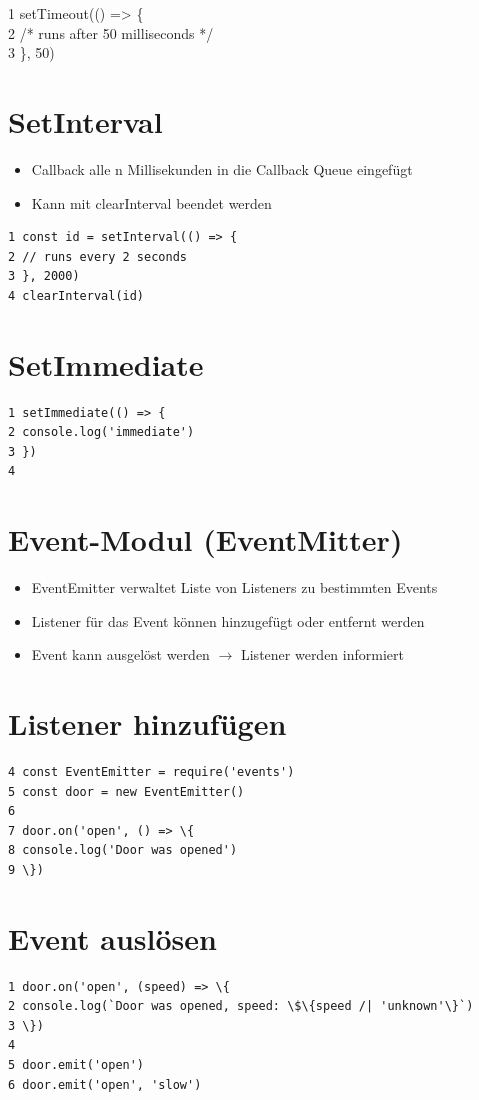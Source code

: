 1 setTimeout(() => \{\\
2 /* runs after 50 milliseconds */\\
3 \}, 50)

\section*{SetInterval}
\begin{itemize}
  \item Callback alle n Millisekunden in die Callback Queue eingefügt
  \item Kann mit clearInterval beendet werden
\end{itemize}

\begin{verbatim}
1 const id = setInterval(() => {
2 // runs every 2 seconds
3 }, 2000)
4 clearInterval(id)
\end{verbatim}

\section*{SetImmediate}
\begin{verbatim}
1 setImmediate(() => {
2 console.log('immediate')
3 })
4
\end{verbatim}

\section*{Event-Modul (EventMitter)}
\begin{itemize}
  \item EventEmitter verwaltet Liste von Listeners zu bestimmten Events
  \item Listener für das Event können hinzugefügt oder entfernt werden
  \item Event kann ausgelöst werden $\rightarrow$ Listener werden informiert
\end{itemize}

\section*{Listener hinzufügen}
\begin{verbatim}
4 const EventEmitter = require('events')
5 const door = new EventEmitter()
6
7 door.on('open', () => \{
8 console.log('Door was opened')
9 \})
\end{verbatim}

\section*{Event auslösen}
\begin{verbatim}
1 door.on('open', (speed) => \{
2 console.log(`Door was opened, speed: \$\{speed /| 'unknown'\}`)
3 \})
4
5 door.emit('open')
6 door.emit('open', 'slow')
\end{verbatim}

